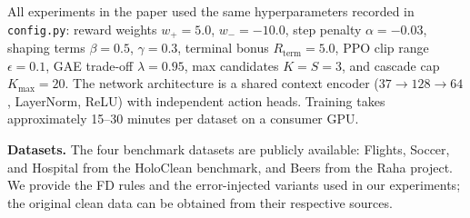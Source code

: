 \documentclass[sigconf]{acmart}
\begin{document}
All experiments in the paper used the same hyperparameters recorded in \texttt{config.py}: reward weights $w_{+}=5.0$, $w_{-}=-10.0$, step penalty $\alpha=-0.03$, shaping terms $\beta=0.5$, $\gamma=0.3$, terminal bonus $R_{\text{term}}=5.0$, PPO clip range $\epsilon=0.1$, GAE trade-off $\lambda=0.95$, max candidates $K=S=3$, and cascade cap $K_{\max}=20$. The network architecture is a shared context encoder ($37 \rightarrow 128 \rightarrow 64$, LayerNorm, ReLU) with independent action heads. Training takes approximately 15--30 minutes per dataset on a consumer GPU.

\noindent\textbf{Datasets.}
The four benchmark datasets are publicly available: Flights, Soccer, and Hospital from the HoloClean benchmark, and Beers from the Raha project. We provide the FD rules and the error-injected variants used in our experiments; the original clean data can be obtained from their respective sources.
\end{document}
